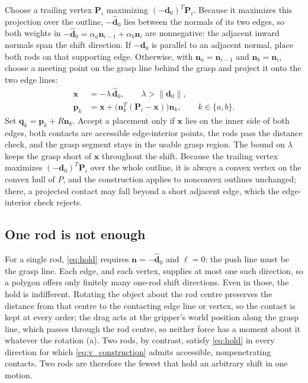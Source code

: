Choose a trailing vertex $\mathbf P_i$ maximizing $(-\mathbf d_0)^T\mathbf P_i$. Because it maximizes this projection over the outline, $-\hat{\mathbf d}_0$ lies between the normals of its two edges, so both weights in $-\hat{\mathbf d}_0=\alpha_a\mathbf n_{i-1}+\alpha_b\mathbf n_i$ are nonnegative: the adjacent inward normals span the shift direction. If $-\mathbf d_0$ is parallel to an adjacent normal, place both rods on that supporting edge. Otherwise, with $\mathbf n_a=\mathbf n_{i-1}$ and $\mathbf n_b=\mathbf n_i$, choose a meeting point on the grasp line behind the grasp and project it onto the two edge lines:
\begin{equation}
\begin{aligned}
  \mathbf x&=-\lambda\,\hat{\mathbf d}_0,\qquad \lambda>\|\mathbf d_0\|,\\
  \mathbf p_k&=\mathbf x+\bigl(\mathbf n_k^T(\mathbf P_i-\mathbf x)\bigr)\mathbf n_k,\qquad k\in\{a,b\}.
\end{aligned}
  \label{eq:v_construction}
\end{equation}
Set $\mathbf q_k=\mathbf p_k+R\mathbf n_k$. Accept a placement only if $\mathbf x$ lies on the inner side of both edges, both contacts are accessible edge-interior points, the rods pass the distance check, and the grasp segment stays in the usable grasp region. The bound on $\lambda$ keeps the grasp short of $\mathbf x$ throughout the shift. Because the trailing vertex maximizes $(-\mathbf d_0)^T\mathbf P_i$ over the whole outline, it is always a convex vertex on the convex hull of $P$, and the construction applies to nonconvex outlines unchanged; there, a projected contact may fall beyond a short adjacent edge, which the edge-interior check rejects.

\subsection{One rod is not enough}
\label{sec:minimal}
For a single rod, \eqref{eq:hold} requires $\mathbf n=-\hat{\mathbf d}_0$ and $\ell=0$: the push line must be the grasp line. Each edge, and each vertex, supplies at most one such direction, so a polygon offers only finitely many one-rod shift directions. Even in those, the hold is indifferent. Rotating the object about the rod centre preserves the distance from that centre to the contacting edge line or vertex, so the contact is kept at every order; the drag acts at the gripper's world position along the grasp line, which passes through the rod centre, so neither force has a moment about it whatever the rotation (a). Two rods, by contrast, satisfy \eqref{eq:hold} in every direction for which \eqref{eq:v_construction} admits accessible, nonpenetrating contacts. Two rods are therefore the fewest that hold an arbitrary shift in one motion.

